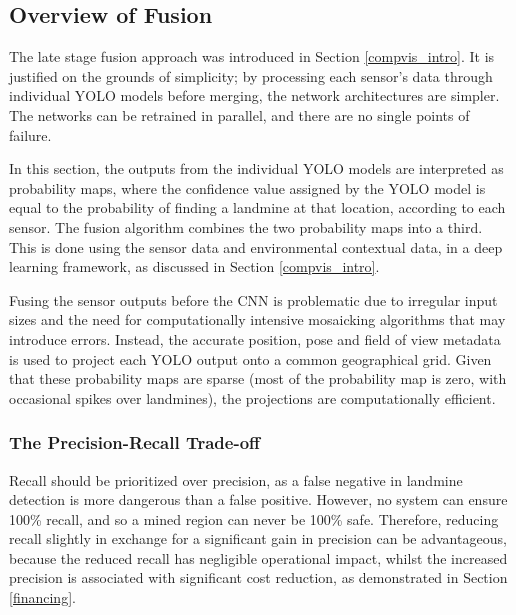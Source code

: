 \subsection{Overview of Fusion} \label{fusion_overview}

    \noindent The late stage fusion approach was introduced in Section \ref{compvis_intro}. It is justified on the grounds of simplicity; by processing each sensor's data through individual YOLO models before merging, the network architectures are simpler. The networks can be retrained in parallel, and there are no single points of failure. 
    


    \noindent In this section, the outputs from the individual YOLO models are interpreted as probability maps, where the confidence value assigned by the YOLO model is equal to the probability of finding a landmine at that location, according to each sensor. The fusion algorithm combines the two probability maps into a third. This is done using the sensor data and environmental contextual data, in a deep learning framework, as discussed in Section \ref{compvis_intro}.

    Fusing the sensor outputs before the CNN is problematic due to irregular input sizes and the need for computationally intensive mosaicking algorithms that may introduce errors. Instead, the accurate position, pose and field of view metadata  is used to project each YOLO output onto a common geographical grid. Given that these probability maps are sparse (most of the probability map is zero, with occasional spikes over landmines), the projections are computationally efficient.

    \subsubsection{The Precision-Recall Trade-off } \label{lossmatrix}

        Recall should be prioritized over precision, as a false negative in landmine detection is more dangerous than a false positive. However, no system can ensure 100\% recall, and so a mined region can never be 100\% safe. Therefore, reducing recall slightly in exchange  for a significant gain in precision can be advantageous, because the reduced recall has negligible operational impact, whilst the increased precision is associated with significant cost reduction, as demonstrated in Section \ref{financing}.
